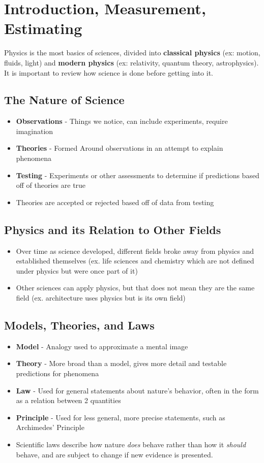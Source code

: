 \section{Introduction, Measurement, Estimating}
Physics is the most basics of sciences, divided into \textbf{classical physics} (ex: motion, fluids, light) and \textbf{modern physics} (ex: relativity, quantum theory, astrophysics). It is important to review how science is done before getting into it.

\subsection{The Nature of Science}
    \begin{itemize}
        \item \textbf{Observations} - Things we notice, can include experiments, require imagination
        \item \textbf{Theories} - Formed Around observations in an attempt to explain phenomena
        \item \textbf{Testing} - Experiments or other assessments to determine if predictions based off of theories are true
        \item Theories are accepted or rejected based off of data from testing
    \end{itemize}
	
\subsection{Physics and its Relation to Other Fields}
    \begin{itemize}
        \item Over time as science developed, different fields broke away from physics and established themselves (ex. life sciences and chemistry which are not defined under physics but were once part of it)
        \item Other sciences can apply physics, but that does not mean they are the same field (ex. architecture uses physics but is its own field)
    \end{itemize}
	
\subsection{Models, Theories, and Laws}
    \begin{itemize}
        \item \textbf{Model} - Analogy used to approximate a mental image 
        \item \textbf{Theory} - More broad than a model, gives more detail and testable predictions for phenomena
        \item \textbf{Law} - Used for general statements about nature's behavior, often in the form as a relation between 2 quantities
        \item \textbf{Principle} - Used for less general, more precise statements, such as Archimedes' Principle
        \item Scientific laws describe how nature \emph{does} behave rather than how it \emph{should} behave, and are subject to change if new evidence is presented.
    \end{itemize}
	
